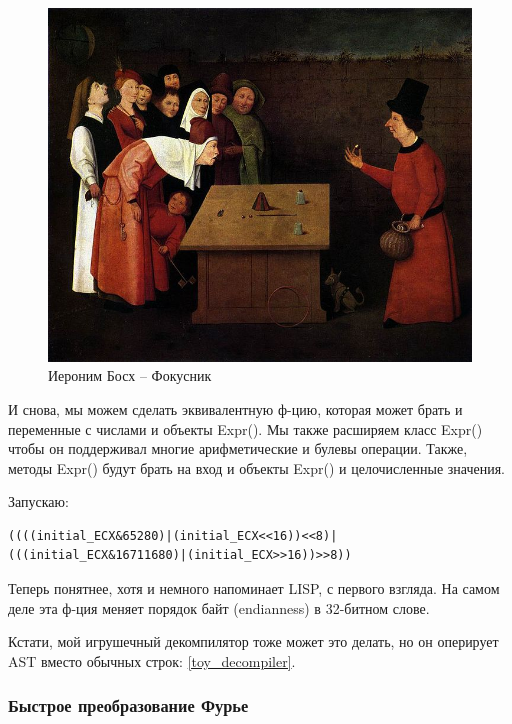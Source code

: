 \begin{figure}[H]
\centering
\includegraphics[scale=2.5]{symbolic/2_assembly/718px-Conjurer_Bosch.jpg}
\caption{Иероним Босх -- Фокусник}
\end{figure}

И снова, мы можем сделать эквивалентную ф-цию, которая может брать и переменные с числами и объекты Expr().
Мы также расширяем класс Expr() чтобы он поддерживал многие арифметические и булевы операции.
Также, методы Expr() будут брать на вход и объекты Expr() и целочисленные значения.



Запускаю:

\begin{lstlisting}
((((initial_ECX&65280)|(initial_ECX<<16))<<8)|(((initial_ECX&16711680)|(initial_ECX>>16))>>8))
\end{lstlisting}

Теперь понятнее, хотя и немного напоминает LISP, с первого взгляда.
На самом деле эта ф-ция меняет порядок байт (endianness) в 32-битном слове.

Кстати, мой игрушечный декомпилятор тоже может это делать, но он оперирует \ac{AST} вместо обычных строк:
\ref{toy_decompiler}.

\subsubsection{Быстрое преобразование Фурье}

